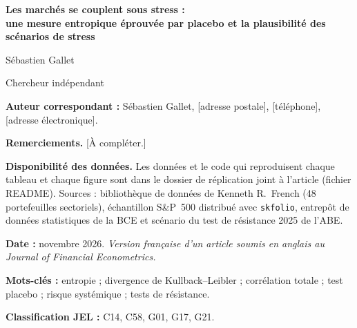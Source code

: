 \documentclass[12pt]{article}
\theoremstyle{definition}
\begin{document}
\begin{titlepage}
\begin{center}
{\Large\bfseries Les marchés se couplent sous stress :\\[4pt]
une mesure entropique éprouvée par placebo et la plausibilité des scénarios de stress\par}
\vspace{1.5cm}
{\large Sébastien Gallet\par}
\vspace{0.3cm}
Chercheur indépendant\par
\vspace{1.2cm}
\end{center}
\noindent\textbf{Auteur correspondant :} Sébastien Gallet, [adresse postale],
[téléphone], [adresse électronique].\par
\vspace{0.6cm}
\noindent\textbf{Remerciements.} [À compléter.]\par
\vspace{0.6cm}
\noindent\textbf{Disponibilité des données.} Les données et le code qui
reproduisent chaque tableau et chaque figure sont dans le dossier de
réplication joint à l'article (fichier README). Sources : bibliothèque de
données de Kenneth R.\ French (48 portefeuilles sectoriels), échantillon
S\&P~500 distribué avec \texttt{skfolio}, entrepôt de données statistiques de
la BCE et scénario du test de résistance 2025 de l'ABE.\par
\vspace{0.6cm}
\noindent\textbf{Date :} novembre 2026. \emph{Version française d'un article
soumis en anglais au Journal of Financial Econometrics.}
\end{titlepage}
\setcounter{page}{2}

\begin{doublespace}
\begin{abstract}
\noindent Nous construisons une mesure entropique du couplage des marchés et
la confrontons à deux témoins placebo, l'un sans dynamique, l'autre qui
préserve une volatilité GARCH. Sur les actions et les secteurs américains et
sur les marchés de la zone euro, le couplage passe les deux témoins et une
comparaison au sein de chaque année : sous stress, les corrélations se
couplent et le nombre effectif de sources de risque indépendantes diminue.
Les mêmes tests montrent que d'autres signatures de crise des indicateurs
entropiques glissants, comme les sauts et l'épaississement des queues, sont
des artefacts d'estimation. Nous donnons le biais à distance finie de
l'estimateur et la taille et la puissance du test, et chiffrons en nats des
scénarios de stress, dont le scénario adverse 2025 de l'ABE.
\end{abstract}

\vspace{0.5cm}
\noindent\textbf{Mots-clés :} entropie ; divergence de Kullback--Leibler ;
corrélation totale ; test placebo ; risque systémique ; tests de résistance.

\noindent\textbf{Classification JEL :} C14, C58, G01, G17, G21.
\end{doublespace}
\newpage
\end{document}
